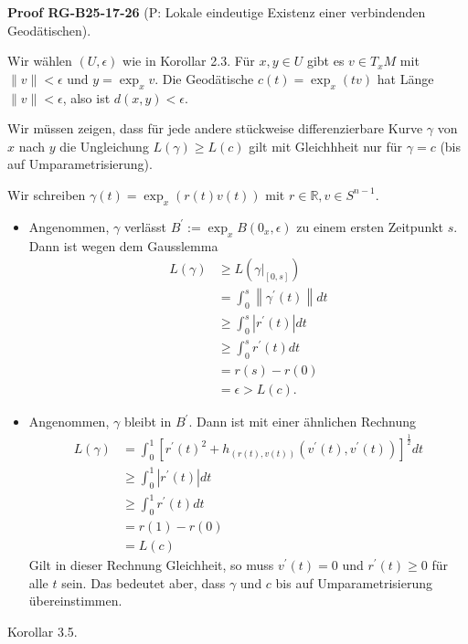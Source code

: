 \documentclass[10pt, letterpaper]{article}
\newcommand{\CustomHeading}[3]{%
  \par\medskip\noindent%
  \textbf{#1 #2} \textnormal{(#3)}.\enskip%
}
\newenvironment{PROOF}[2]{\begin{unitbox}\CustomHeading{Proof}{#1}{#2}}{\end{unitbox}}
\begin{document}
\begin{PROOF}{RG-B25-17-26}{P: Lokale eindeutige Existenz einer verbindenden Geodätischen}
Wir wählen $(U, \epsilon)$ wie in Korollar 2.3. Für $x, y \in U$ gibt es $v \in T_{x} M$ mit $\|v\|<\epsilon$ und $y=\exp _{x} v$. Die Geodätische $c(t)=\exp _{x}(t v)$ hat Länge $\|v\|<\epsilon$, also ist $d(x, y)<\epsilon$.

Wir müssen zeigen, dass für jede andere stückweise differenzierbare Kurve $\gamma$ von $x$ nach $y$ die Ungleichung $L(\gamma) \geq L(c)$ gilt mit Gleichhheit nur für $\gamma=c$ (bis auf Umparametrisierung).

Wir schreiben $\gamma(t)=\exp _{x}(r(t) v(t))$ mit $r \in \mathbb{R}, v \in S^{n-1}$.
\begin{itemize}
  \item Angenommen, $\gamma$ verlässt $B^{\prime}:=\exp _{x} B\left(0_{x}, \epsilon\right)$ zu einem ersten Zeitpunkt $s$. Dann ist wegen dem Gausslemma
$$
\begin{aligned}
L(\gamma) & \geq L\left(\left.\gamma\right|_{[0, s]}\right) \\
& =\int_{0}^{s}\left\|\gamma^{\prime}(t)\right\| d t \\
& \geq \int_{0}^{s}\left|r^{\prime}(t)\right| d t \\
& \geq \int_{0}^{s} r^{\prime}(t) d t \\
& =r(s)-r(0) \\
& =\epsilon>L(c) .
\end{aligned}
$$

  \item Angenommen, $\gamma$ bleibt in $B^{\prime}$. Dann ist mit einer ähnlichen Rechnung
$$
\begin{aligned}
L(\gamma) & =\int_{0}^{1}\left[r^{\prime}(t)^{2}+h_{(r(t), v(t))}\left(v^{\prime}(t), v^{\prime}(t)\right)\right]^{\frac{1}{2}} d t \\
& \geq \int_{0}^{1}\left|r^{\prime}(t)\right| d t \\
& \geq \int_{0}^{1} r^{\prime}(t) d t \\
& =r(1)-r(0) \\
& =L(c)
\end{aligned}
$$
Gilt in dieser Rechnung Gleichheit, so muss $v^{\prime}(t)=0$ und $r^{\prime}(t) \geq 0$ für alle $t$ sein. Das bedeutet aber, dass $\gamma$ und $c$ bis auf Umparametrisierung übereinstimmen.
\end{itemize}
\end{PROOF}


Korollar 3.5. 
\end{document}
